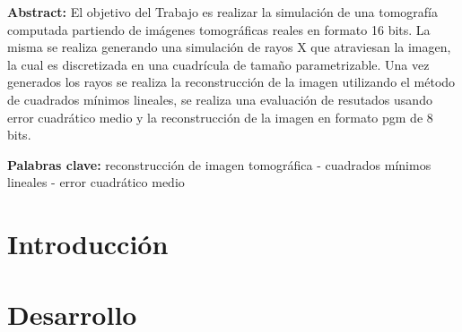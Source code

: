 \documentclass[10pt,a4paper]{article}
\begin{document}


\fecha{\today}



\maketitle
\par \textbf{Abstract:} El objetivo del Trabajo es realizar la simulación de una tomografía computada partiendo de imágenes tomográficas reales en formato 16 bits. La misma se realiza generando una simulación de rayos X que atraviesan la imagen, la cual es discretizada en una cuadrícula de tamaño parametrizable. Una vez generados los rayos se realiza la reconstrucción de la imagen utilizando el método de cuadrados mínimos lineales, se realiza una evaluación de resutados usando error cuadrático medio y la reconstrucción de la imagen en formato pgm de 8 bits.

\par  \textbf{Palabras clave:} reconstrucción de imagen tomográfica - cuadrados mínimos lineales - error cuadrático medio
\tableofcontents


\newpage

\section{Introducción}

\newpage


\section{Desarrollo}

\newpage
\end{document}
